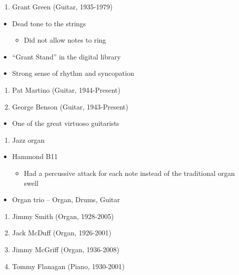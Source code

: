 \documentclass[]{article}
\providecommand{\tightlist}{%
  \setlength{\itemsep}{0pt}\setlength{\parskip}{0pt}}
\begin{document}
\begin{enumerate}
\def\labelenumi{\arabic{enumi}.}
\setcounter{enumi}{15}
\tightlist
\item
  Grant Green (Guitar, 1935-1979)
\end{enumerate}

\begin{itemize}
\tightlist
\item
  Dead tone to the strings

  \begin{itemize}
  \tightlist
  \item
    Did not allow notes to ring
  \end{itemize}
\item
  ``Grant Stand'' in the digital library
\item
  Strong sense of rhythm and syncopation
\end{itemize}

\begin{enumerate}
\def\labelenumi{\arabic{enumi}.}
\setcounter{enumi}{16}
\tightlist
\item
  Pat Martino (Guitar, 1944-Present)
\item
  George Benson (Guitar, 1943-Present)
\end{enumerate}

\begin{itemize}
\tightlist
\item
  One of the great virtuoso guitarists
\end{itemize}

\begin{enumerate}
\def\labelenumi{\arabic{enumi}.}
\setcounter{enumi}{18}
\tightlist
\item
  Jazz organ
\end{enumerate}

\begin{itemize}
\tightlist
\item
  Hammond B11

  \begin{itemize}
  \tightlist
  \item
    Had a percussive attack for each note instead of the traditional
    organ swell
  \end{itemize}
\item
  Organ trio -- Organ, Drums, Guitar
\end{itemize}

\begin{enumerate}
\def\labelenumi{\arabic{enumi}.}
\setcounter{enumi}{19}
\tightlist
\item
  Jimmy Smith (Organ, 1928-2005)
\item
  Jack McDuff (Organ, 1926-2001)
\item
  Jimmy McGriff (Organ, 1936-2008)
\item
  Tommy Flanagan (Piano, 1930-2001)
\end{enumerate}
\end{document}
